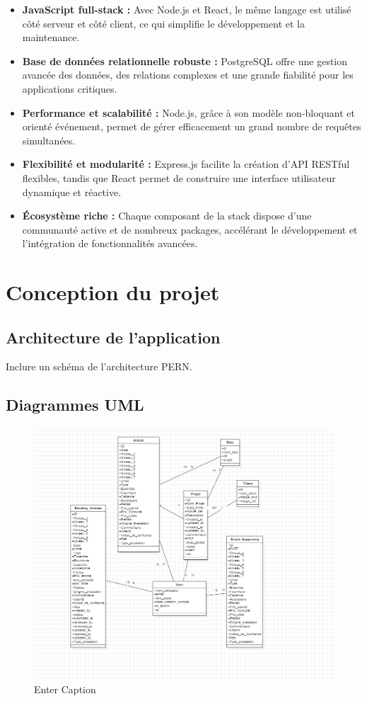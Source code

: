 \documentclass[12pt,a4paper]{report}
\begin{document}
\begin{itemize}
    \item \textbf{JavaScript full-stack :} Avec Node.js et React, le même langage est utilisé côté serveur et côté client, ce qui simplifie le développement et la maintenance.
    \item \textbf{Base de données relationnelle robuste :} PostgreSQL offre une gestion avancée des données, des relations complexes et une grande fiabilité pour les applications critiques.
    \item \textbf{Performance et scalabilité :} Node.js, grâce à son modèle non-bloquant et orienté événement, permet de gérer efficacement un grand nombre de requêtes simultanées.
    \item \textbf{Flexibilité et modularité :} Express.js facilite la création d’API RESTful flexibles, tandis que React permet de construire une interface utilisateur dynamique et réactive.
    \item \textbf{Écosystème riche :} Chaque composant de la stack dispose d’une communauté active et de nombreux packages, accélérant le développement et l’intégration de fonctionnalités avancées.
\end{itemize}

\chapter{Conception du projet}
\section{Architecture de l’application}
Inclure un schéma de l’architecture PERN.  

\section{Diagrammes UML}

\begin{figure}[H]
    \centering
    \includegraphics[width=0.5\linewidth]{image.png}
    \caption{Enter Caption}
    \label{fig:placeholder}
\end{figure}
\end{document}
